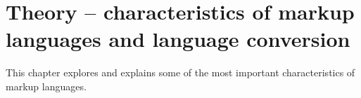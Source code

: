 \documentclass{scrreprt}
\begin{document}































%
%
%
%
%
%


\chapter{Theory -- characteristics of markup languages and language conversion}
\label{sec:theory}
This chapter explores and explains some of the most important characteristics of markup languages.
\end{document}

